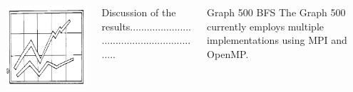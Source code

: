 \documentclass[final]{beamer}
\begin{document}
\begin{frame}[t]
\begin{columns}[t]
\begin{column}{0.60\paperwidth}
\begin{columns}[t,totalwidth=0.60\paperwidth]
\begin{column}{0.28\paperwidth}
\begin{columns}[t,totalwidth=0.28\paperwidth]
\begin{column}{0.12\paperwidth}
								\begin{center} \includegraphics[width=0.12\paperwidth]{img/temp} \end{center}
							\end{column}
						\end{columns}
					\end{column}
					\begin{column}{0.28\paperwidth}
						Discussion of the results...........................................................
					\end{column}
				\end{columns}
			\end{column}
			\begin{column}{0.28\paperwidth}
				\begin{block}{Graph 500 BFS}
				The Graph 500 currently employs multiple implementations using MPI and OpenMP.  
					

\end{block}
\end{column}
\end{columns}
\end{frame}
\end{document}
